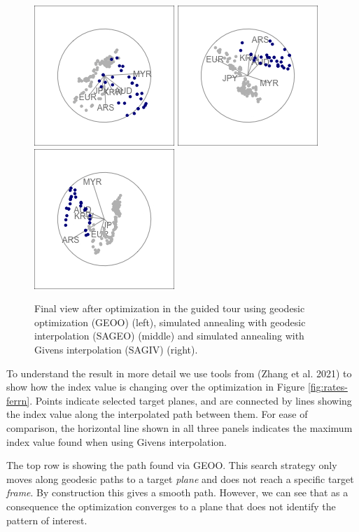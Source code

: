 \begin{figure}

{\centering \includegraphics[width=0.3\linewidth]{figures/rates_tour_geodesic_final} \includegraphics[width=0.3\linewidth]{figures/rates_tour_better_final} \includegraphics[width=0.3\linewidth]{figures/rates_tour_givens_final} 

}

\caption{Final view after optimization in the guided tour using geodesic optimization  (GEOO) (left), simulated annealing with geodesic interpolation (SAGEO) (middle) and simulated annealing with Givens interpolation (SAGIV) (right).}\label{fig:rates-tour-static}
\end{figure}

To understand the result in more detail we use tools from  (Zhang et al. 2021) to show how the index value is changing over the optimization in Figure \ref{fig:rates-ferrn}. Points indicate selected target planes, and are connected by lines showing the index value along the interpolated path between them. For ease of comparison, the horizontal line shown in all three panels indicates the maximum index value found when using Givens interpolation.

The top row is showing the path found via GEOO. This search strategy only moves along geodesic paths to a target \emph{plane} and does not reach a specific target \emph{frame}. By construction this gives a smooth path. However, we can see that as a consequence the optimization converges to a plane that does not identify the pattern of interest.

